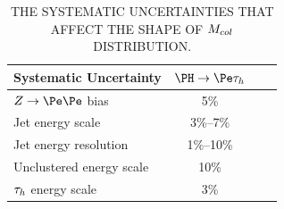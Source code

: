 \begin{table}[hbtp]
 \centering
 \caption{THE SYSTEMATIC UNCERTAINTIES THAT AFFECT THE SHAPE OF $M_{col}$ DISTRIBUTION.}
  \label{tab:shape_systematics}
  \begin{tabular}{lclc} \hline
Systematic Uncertainty                                 &   $\PH \to \Pe \tauh$                   \\ \hline
$Z \to \Pe\Pe$ bias                                       &   5\%                                         \\
Jet energy scale                                           &    3\%--7\%                                       \\
Jet energy resolution                                    &    1\%--10\%                                       \\
Unclustered energy scale                             &    10\%                                       \\
$\tau_{h}$ energy scale                                    &    3\%                                         \\    \hline
  \end{tabular}
\end{table}



